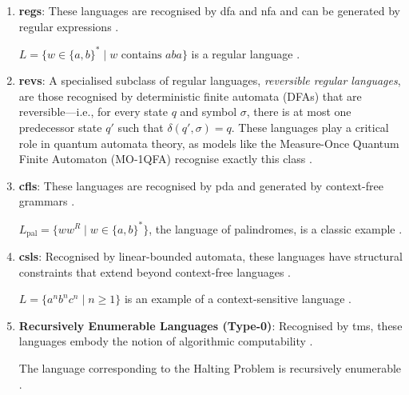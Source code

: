 \begin{enumerate}
    \item \textbf{\glspl{reg}}:  
    These languages are recognised by \gls{dfa} and \gls{nfa} and can be generated by regular expressions \cite{sipser2013introduction}. 
    \begin{example}
    $L = \{w \in \{a, b\}^\ast \mid w \text{ contains } aba\}$ is a regular language \cite{sipser2013introduction}.
    \end{example}

    \item \textbf{\glspl{rev}}:
    A specialised subclass of regular languages, \textit{reversible regular languages}, are those recognised by deterministic finite automata (DFAs) that are reversible—i.e., for every state \( q \) and symbol \( \sigma \), there is at most one predecessor state \( q' \) such that \( \delta(q', \sigma) = q \). These languages play a critical role in quantum automata theory, as models like the Measure-Once Quantum Finite Automaton (MO-1QFA) recognise exactly this class \cite{kondacs1997power}.
    
    \item \textbf{\glspl{cfl}}:  
    These languages are recognised by \gls{pda} and generated by context-free grammars \cite{chomsky1956three, sipser2013introduction}.  
    \begin{example}
    $L_{\text{pal}} = \{ww^R \mid w \in \{a, b\}^\ast\}$, the language of palindromes, is a classic example \cite{chomsky1956three}.
    \end{example}

    \item \textbf{\glspl{csl}}:  
    Recognised by linear-bounded automata, these languages have structural constraints that extend beyond context-free languages \cite{chomsky1956three, sipser2013introduction}.  
    \begin{example}
    $L = \{a^n b^n c^n \mid n \geq 1\}$ is an example of a context-sensitive language \cite{chomsky1956three}.
    \end{example}

    \item \textbf{Recursively Enumerable Languages (Type-0)}:  
    Recognised by \glspl{tm}, these languages embody the notion of algorithmic computability \cite{sipser2013introduction, turing1936computable}.  
    \begin{example}
    The language corresponding to the Halting Problem is recursively enumerable \cite{sipser2013introduction}.
    \end{example}


\end{enumerate}
